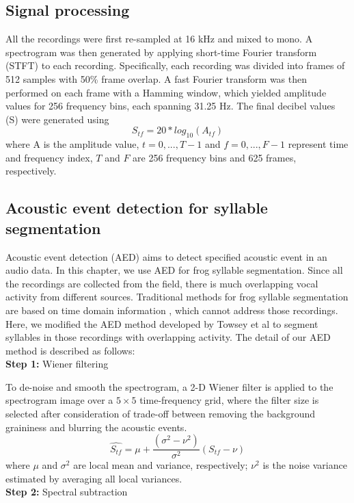 \subsection{Signal processing}
All the recordings were first re-sampled at 16 kHz and mixed to mono. A spectrogram was then generated by applying short-time Fourier transform (STFT) to each recording. Specifically, each recording was
divided into frames of 512 samples with 50\% frame overlap.
A fast Fourier transform was then performed on each frame with a Hamming window, which yielded amplitude values for 256 frequency bins, each spanning 31.25 Hz. The final
decibel values (S) were generated using 
\begin{equation}
S_{tf} = 20*log_{10}(A_{tf})
\end{equation}
where A is the amplitude value, $t=0,...,T-1$ and $f=0,...,F-1$ represent time and frequency index, $T$ and $F$ are 256 frequency bins and 625 frames, respectively. 

\subsection{Acoustic event detection for syllable segmentation}
Acoustic event detection (AED) aims to detect specified acoustic event in an audio data. In this chapter, we use AED for frog syllable segmentation. Since all the recordings are collected from the field, there is much overlapping vocal activity from different sources. Traditional methods for frog syllable segmentation are based on time domain information \cite{somervuo2004classification,huang2009frog}, which cannot address those recordings. Here, we modified the AED method developed by Towsey et al \cite{towsey2012toolbox} to segment syllables in those recordings with overlapping activity. The detail of our AED method is described as follows:
\\
\textbf{Step 1:} Wiener filtering 

\noindent To de-noise and smooth the spectrogram, a 2-D Wiener filter is applied to the spectrogram image over a $5 \times 5$ time-frequency grid, where the filter size is selected after consideration of trade-off between removing the background graininess and blurring the acoustic events.
\begin{equation}
\hat{S_{tf}} = \mu + \frac{(\sigma^{2}-\nu^{2})}{\sigma^{2}}(S_{tf}-\nu)
\end{equation}
where $\mu$ and $\sigma^{2}$ are local mean and variance, respectively; $\nu^{2}$ is the noise variance estimated by averaging all local variances. 
\\
\textbf{Step 2:} Spectral subtraction


